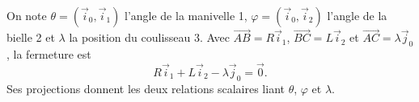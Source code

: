 \begin{corrigebox}
On note $\theta=(\vec i_0,\vec i_1)$ l'angle de la manivelle 1,
$\varphi=(\vec i_0,\vec i_2)$ l'angle de la bielle 2 et $\lambda$ la position
du coulisseau 3. Avec $\overrightarrow{AB}=R\vec i_1$,
$\overrightarrow{BC}=L\vec i_2$ et $\overrightarrow{AC}=\lambda\vec j_0$,
la fermeture est
\[R\vec i_1+L\vec i_2-\lambda\vec j_0=\vec0.\]
Ses projections donnent les deux relations scalaires liant
$\theta$, $\varphi$ et $\lambda$.
\end{corrigebox}
